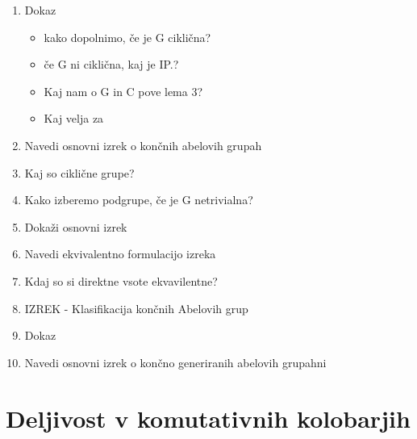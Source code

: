 \documentclass{article}
\begin{document}
\begin{enumerate}
        \item Dokaz 
        \begin{itemize}
            \item kako dopolnimo, če je G ciklična?
            \item če G ni ciklična, kaj je IP.?
            \item Kaj nam o G in C pove lema 3?
            \item Kaj velja za 
        \end{itemize}
        \item Navedi osnovni izrek o končnih abelovih grupah
        \item Kaj so ciklične grupe?
        \item Kako izberemo podgrupe, če je G netrivialna?
        \item Dokaži osnovni izrek
        \item Navedi ekvivalentno formulacijo izreka
        \item Kdaj so si direktne vsote ekvavilentne?
        \item IZREK - Klasifikacija končnih Abelovih grup
        \item Dokaz
        \item Navedi osnovni izrek o končno generiranih abelovih grupahni
    \end{enumerate}

    \section{Deljivost v komutativnih kolobarjih}
\end{document}
